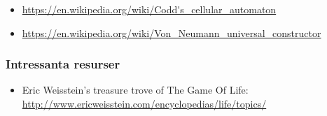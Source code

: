 \begin{itemize}[noitemsep,topsep=0pt]
	\item \url{https://en.wikipedia.org/wiki/Codd's_cellular_automaton}
	\item \url{https://en.wikipedia.org/wiki/Von_Neumann_universal_constructor}
\end{itemize}

\subsubsection{Intressanta resurser}

\begin{itemize}[noitemsep,topsep=0pt]
    \item Eric Weisstein's treasure trove of The Game Of Life: \url{http://www.ericweisstein.com/encyclopedias/life/topics/}
\end{itemize}










